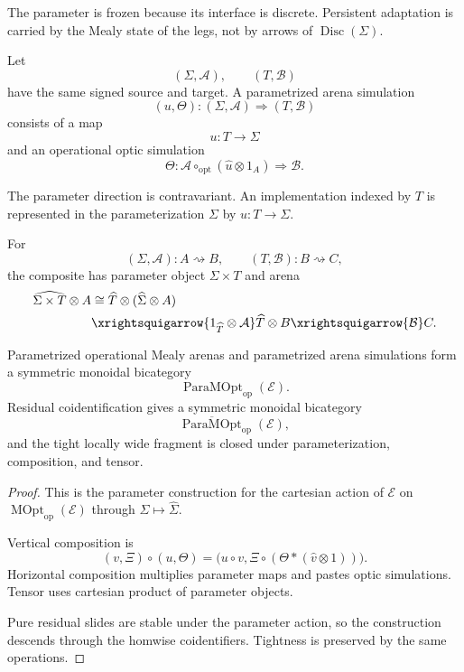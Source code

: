 The parameter is frozen because its interface is discrete. Persistent adaptation is carried by the
Mealy state of the legs, not by arrows of \(\operatorname{Disc}(\Sigma)\).

\begin{definition}
\label{def:parametrized-arena-simulation}
Let
\[
  (\Sigma,\mathcal A),
  \qquad
  (T,\mathcal B)
\]
have the same signed source and target. A parametrized arena simulation
\[
  (u,\Theta):
  (\Sigma,\mathcal A)
  \Longrightarrow
  (T,\mathcal B)
\]
consists of a map
\[
  u:T\longrightarrow\Sigma
\]
and an operational optic simulation
\[
  \Theta:
  \mathcal A\circ_{\mathrm{opt}}(\widehat u\otimes1_A)
  \Longrightarrow
  \mathcal B.
\]
\end{definition}

The parameter direction is contravariant. An implementation indexed by \(T\) is represented in the
parameterization \(\Sigma\) by \(u:T\to\Sigma\).

For
\[
  (\Sigma,\mathcal A):A\rightsquigarrow B,
  \qquad
  (T,\mathcal B):B\rightsquigarrow C,
\]
the composite has parameter object \(\Sigma\times T\) and arena
\[
\begin{aligned}
  \widehat{\Sigma\times T}\otimes A
  &\cong
  \widehat T\otimes(\widehat\Sigma\otimes A)
  \\
  &\xrightsquigarrow{1_{\widehat T}\otimes\mathcal A}
  \widehat T\otimes B
  \xrightsquigarrow{\mathcal B}
  C.
\end{aligned}
\]

\begin{theorem}
\label{thm:parametrized-operational-arenas}
Parametrized operational Mealy arenas and parametrized arena simulations form a symmetric monoidal
bicategory
\[
  \operatorname{ParaMOpt}_{\mathrm{op}}(\mathcal E).
\]
Residual coidentification gives a symmetric monoidal bicategory
\[
  \overline{\operatorname{ParaMOpt}}_{\mathrm{op}}(\mathcal E),
\]
and the tight locally wide fragment is closed under parameterization, composition, and tensor.
\end{theorem}

\begin{proof}
This is the parameter construction for the cartesian action of \(\mathcal E\) on
\(\operatorname{MOpt}_{\mathrm{op}}(\mathcal E)\) through
\(\Sigma\mapsto\widehat\Sigma\).

Vertical composition is
\[
  (v,\Xi)\circ(u,\Theta)
  =
  \bigl(
    u\circ v,
    \Xi\circ(\Theta\ast(\widehat v\otimes1))
  \bigr).
\]
Horizontal composition multiplies parameter maps and pastes optic simulations. Tensor uses
cartesian product of parameter objects.

Pure residual slides are stable under the parameter action, so the construction descends through
the homwise coidentifiers. Tightness is preserved by the same operations.
\end{proof}

